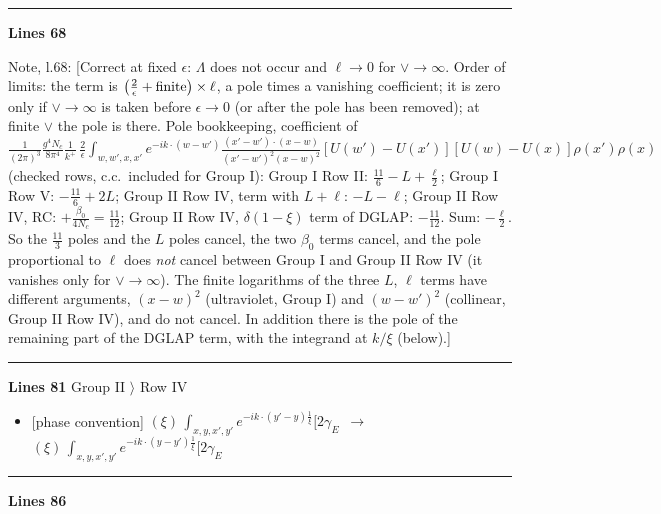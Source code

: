 \documentclass[10pt]{article}
\newenvironment{notebox}{\def\FrameCommand{{\color{notebar}\vrule width 1.5pt}\hspace{6pt}}\MakeFramed{\advance\hsize-\width\FrameRestore}\small}{\endMakeFramed}
\begin{document}
\noindent\rule{\linewidth}{0.3pt}\par\noindent\textbf{Lines 68}\par
\begin{notebox}\textsf{\small Note, l.68:} [Correct at fixed $\epsilon$: $\Lambda$ does not occur and $\ell\to0$ for $\vee\to\infty$. Order of limits: the term is $\big(\frac{2}{\epsilon}+{\rm finite}\big)\times\ell$, a pole times a vanishing coefficient; it is zero only if $\vee\to\infty$ is taken before $\epsilon\to0$ (or after the pole has been removed); at finite $\vee$ the pole is there. Pole bookkeeping, coefficient of $\frac{1}{(2\pi)^{3}}\frac{g^{4}N_{c}}{8\pi^{4}}\frac{1}{k^{+}}\,\frac{2}{\epsilon}\int_{w,w',x,x'}e^{-ik\cdot(w-w')}\frac{(x'-w')\cdot(x-w)}{(x'-w')^{2}(x-w)^{2}}[U(w')-U(x')][U(w)-U(x)]\rho(x')\rho(x)$ (checked rows, c.c.\ included for Group I): Group I Row II: $\frac{11}{6}-L+\frac{\ell}{2}$; Group I Row V: $-\frac{11}{6}+2L$; Group II Row IV, term with $L+\ell$: $-L-\ell$; Group II Row IV, RC: $+\frac{\beta_{0}}{4N_{c}}=\frac{11}{12}$; Group II Row IV, $\delta(1-\xi)$ term of DGLAP: $-\frac{11}{12}$. Sum: $-\frac{\ell}{2}$. So the $\frac{11}{3}$ poles and the $L$ poles cancel, the two $\beta_{0}$ terms cancel, and the pole proportional to $\ell$ does \emph{not} cancel between Group I and Group II Row IV (it vanishes only for $\vee\to\infty$). The finite logarithms of the three $L$, $\ell$ terms have different arguments, $(x-w)^{2}$ (ultraviolet, Group I) and $(w-w')^{2}$ (collinear, Group II Row IV), and do not cancel. In addition there is the pole of the remaining part of the DGLAP term, with the integrand at $k/\xi$ (below).]\end{notebox}
\noindent\rule{\linewidth}{0.3pt}\par\noindent\textbf{Lines 81} \quad \textsf{Group II $\rangle$ Row IV} \par
\begin{itemize}[leftmargin=2.2em,itemsep=1pt,topsep=2pt]
\item[\textbf{l.81}] \textsf{\small [phase convention]} $\displaystyle (\xi)\,\int_{x,y,x',y'}e^{-ik\cdot(y'-y)\frac{1}{\xi}}\Big[2\gamma_{E}$\ $\longrightarrow$\ $\displaystyle (\xi)\,\int_{x,y,x',y'}e^{-ik\cdot(y-y')\frac{1}{\xi}}\Big[2\gamma_{E}$
\end{itemize}
\noindent\rule{\linewidth}{0.3pt}\par\noindent\textbf{Lines 86}\par
\end{document}
